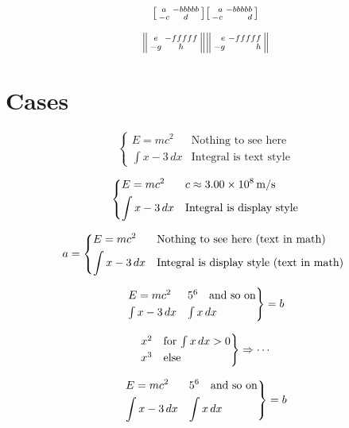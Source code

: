 \documentclass{article}
\begin{document}
\[
\begin{bsmallmatrix*} a & -bbbbb \\ -c & d \end{bsmallmatrix*}
\begin{bsmallmatrix*}[r] a & -bbbbb \\ -c & d \end{bsmallmatrix*}
\]

\[
\begin{Vsmallmatrix*} e & -fffff \\ -g & h \end{Vsmallmatrix*}
\begin{Vsmallmatrix*}[r] e & -fffff \\ -g & h \end{Vsmallmatrix*}
\]

\section{Cases}

\[
\begin{cases}
E = m c^2 & \text{Nothing to see here} \\
\int x-3\, dx & \text{Integral is text style}
\end{cases}
\]

\[
\begin{dcases}
E = m c^2 & c \approx 3.00\times 10^{8}\,\mathrm{m}/\mathrm{s} \\
\int x-3\, dx & \text{Integral is display style}
\end{dcases}
\]

\[
a= \begin{dcases*}
E = m c^2 & Nothing to see here (text in math) \\
\int x-3\, dx & Integral is display style (text in math)
\end{dcases*}
\]

\[
\begin{rcases}
E = m c^2 & 5^6 \quad \text{and so on} \\
\int x-3\, dx & \int x \, dx
\end{rcases} = b
\]

\[
\begin{rcases*}
x^2 & for $\int x\,dx>0$\\
x^3 & else
\end{rcases*} \Rightarrow \cdots
\]

\[
\begin{drcases}
E = m c^2 & 5^6 \quad \text{and so on} \\
\int x-3\, dx & \int x \, dx
\end{drcases} = b
\]
\end{document}
